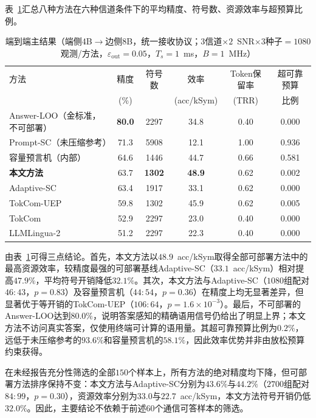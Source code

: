 \documentclass[journal]{IEEEtran}
\begin{document}
表~\ref{tab:main}汇总八种方法在六种信道条件下的平均精度、符号数、资源效率与超预算比例。

\begin{table}[t]
\centering
\caption{端到端主结果（端侧4B$\rightarrow$边侧8B，统一接收协议；$3$信道$\times2$~SNR$\times3$种子$=1080$观测/方法，$\varepsilon_{\mathrm{out}}=0.05$，$T_s=1$~ms，$B=1$~MHz）}
\label{tab:main}
\renewcommand{\arraystretch}{1.00}
\begin{tabular}{lccccc}
\hline
方法 & 精度 & 符号数 & 效率 & Token保留率 & 超可靠预算\\
 & (\%) & & (acc/kSym) & (TRR) & 比例\\
\hline
Answer-LOO（金标准，不可部署） & \textbf{80.0} & 2297 & 34.8 & 0.40 & 0.000\\
Prompt-SC（未压缩参考） & 71.3 & 5908 & 12.1 & 1.00 & 0.936\\
容量预言机（内部） & 64.6 & 1446 & 44.7 & 0.66 & 0.581\\
\textbf{本文方法} & 63.7 & \textbf{1302} & \textbf{48.9} & 0.62 & 0.002\\
Adaptive-SC~\cite{daiTowardAdaptive} & 63.4 & 1917 & 33.1 & 0.62 & 0.000\\
TokCom-UEP & 59.8 & 1302 & 45.9 & 0.62 & 0.005\\
TokCom & 52.9 & 2297 & 23.0 & 0.40 & 0.000\\
LLMLingua-2 & 51.2 & 2297 & 22.3 & 0.40 & 0.000\\
\hline
\end{tabular}
\end{table}

由表~\ref{tab:main}可得三点结论。首先，本文方法以$48.9$~acc/kSym取得全部可部署方法中的最高资源效率，较精度最强的可部署基线Adaptive-SC（$33.1$~acc/kSym）相对提高$47.9\%$，平均符号开销降低$32.1\%$。其次，本文方法与Adaptive-SC（$1080$组配对$46{:}43$，$p=0.83$）及容量预言机（$44{:}54$，$p=0.36$）在精度上均无显著差异，但显著优于等开销的TokCom-UEP（$106{:}64$，$p=1.6\times10^{-3}$）。最后，不可部署的Answer-LOO达到$80.0\%$，说明答案感知的精确语用信号仍给出了明显上界；本文方法不访问真实答案，仅使用终端可计算的语用量。其超可靠预算比例为$0.2\%$，远低于未压缩参考的$93.6\%$和容量预言机的$58.1\%$，因此效率优势并非由放松预算约束获得。

在未经报告充分性筛选的全部$150$个样本上，所有方法的绝对精度均下降，但可部署方法排序保持不变：本文方法与Adaptive-SC分别为$43.6\%$与$44.2\%$（$2700$组配对$84{:}99$，$p=0.30$），资源效率分别为$33.0$与$22.7$~acc/kSym，本文方法符号开销仍低$32.0\%$。因此，主要结论不依赖于前述$60$个通信可答样本的筛选。
\end{document}

